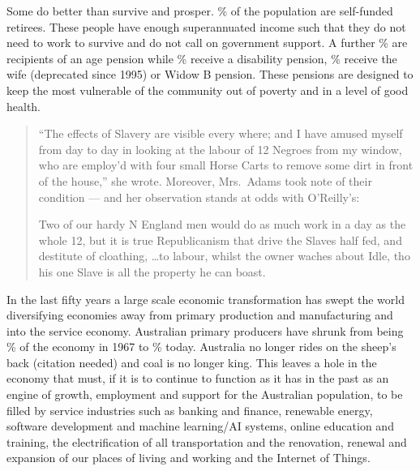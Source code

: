 Some do better than survive and prosper. \% of the population are self-funded retirees. These people have enough superannuated income such that they do not need to work to survive and do not call on government support. A further \% are recipients of an age pension while \% receive a disability pension, \% receive the wife (deprecated since 1995) or Widow B pension. These pensions are designed to keep the most vulnerable of the community out of poverty and in a level of good health.

\begin{quotation}
``The effects of Slavery are visible every where; and I have amused myself from day to day in looking at the labour of 12 Negroes from my window, who are employ'd with four small Horse Carts to remove some dirt in front of the house,'' she wrote. Moreover, Mrs.~Adams took note of their condition --- and her observation stands at odds with O'Reilly's:

Two of our hardy N England men would do as much work in a day as the whole 12, but it is true Republicanism that drive the Slaves half fed, and destitute of cloathing, \ldots to labour, whilst the owner waches about Idle, tho his one Slave is all the property he can boast.\cite{RefWorks:250}
\end{quotation}

In the last fifty years a large scale economic transformation has swept the world diversifying economies away from primary production and manufacturing and into the service economy. Australian primary producers have shrunk from being \% of the economy in 1967 to \% today. Australia no longer rides on the sheep's back (citation needed) and coal is no longer king\cite{RefWorks:253}. This leaves a hole in the economy that must, if it is to continue to function as it has in the past as an engine of growth, employment and support for the Australian population, to be filled by service industries such as banking and finance, renewable energy, software development and machine learning/AI systems, online education and training, the electrification of all transportation and the renovation, renewal and expansion of our places of living and working and the Internet of Things.\cite{RefWorks:254}



